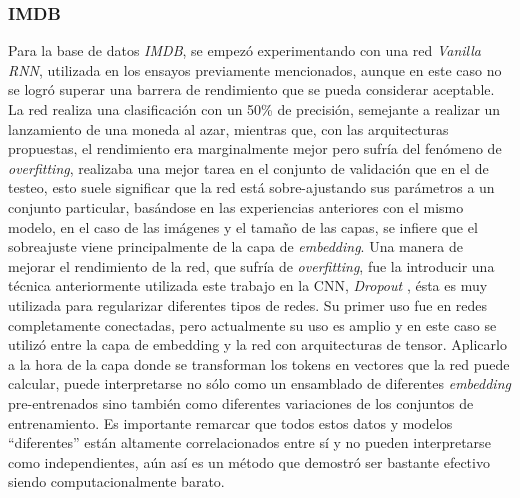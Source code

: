 \documentclass[spanish]{article}
\theoremstyle{definition}
\theoremstyle{remark}
\numberwithin{equation}{section}
\numberwithin{equation}{section} %
\begin{document}
\subsubsection{IMDB}
Para la base de datos \textit{IMDB}, se empezó experimentando con una red  \textit{Vanilla RNN}, utilizada en los ensayos previamente mencionados, aunque en este caso no se logró superar una barrera de rendimiento que se pueda considerar aceptable. La red realiza una clasificación con un 50\% de precisión, semejante a realizar un lanzamiento de una moneda al azar, mientras que, con las arquitecturas propuestas, el rendimiento era marginalmente mejor pero sufría del fenómeno de \textit{overfitting}, realizaba una mejor tarea en el conjunto de validación que en el de testeo, esto suele significar que la red está sobre-ajustando sus parámetros a un conjunto particular, basándose en las experiencias anteriores con el mismo modelo, en el caso de las imágenes y el tamaño de las capas, se infiere que el sobreajuste viene principalmente de la capa de \textit{embedding}. Una manera de mejorar el rendimiento de la red, que sufría de \textit{overfitting}, fue la introducir una técnica anteriormente utilizada este trabajo en la CNN, \textit{Dropout} \cite{srivastava2014dropout}, ésta es muy utilizada para regularizar diferentes tipos de redes. 
Su primer uso fue en redes completamente conectadas, pero actualmente su uso es amplio y en este caso se utilizó entre la capa de embedding y la red con arquitecturas de tensor. Aplicarlo a la hora de la capa donde se transforman los tokens en vectores que la red puede calcular, puede interpretarse no sólo como un ensamblado de diferentes \textit{embedding} pre-entrenados sino también como diferentes variaciones de los conjuntos de entrenamiento. Es importante remarcar que todos estos datos y modelos ``diferentes'' están altamente correlacionados entre sí y no pueden interpretarse como independientes, aún así es un método que demostró ser bastante efectivo siendo computacionalmente barato.                 
\par
\end{document}
